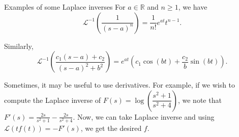 \documentclass[dvipsnames]{beamer}
\theoremstyle{definition}
\let\ge\geqslant
\begin{document}
\begin{frame}{Examples of some Laplace inverses}
  For $a \in \mathbb{R}$ and $n \ge 1$, we have
  \begin{equation*} 
    \mathcal{L}^{-1}\left(\frac{1}{(s - a)^{n}}\right) = \frac{1}{n!} e^{at} t^{n - 1}.
  \end{equation*} \pause

  Similarly,
  \begin{equation*} 
    \mathcal{L}^{-1}\left(\frac{c_{1}(s - a) + c_{2}}{(s - a)^{2} + b^{2}}\right) = e^{at} \left(c_{1} \cos(bt) + \frac{c_{2}}{b} \sin(bt)\right).
  \end{equation*} \pause

  Sometimes, it may be useful to use derivatives. For example, if we wish to compute the Laplace inverse of $F(s) = \log\left(\dfrac{s^{2} + 1}{s^{2} + 4}\right)$, we note that $F'(s) = \frac{2s}{s^{2} + 1} - \frac{2s}{s^{2} + 4}$. \pause Now, we can take Laplace inverse and using $\mathcal{L}(t f(t)) = -F'(s)$, we get the desired $f$.
\end{frame}
\end{document}
